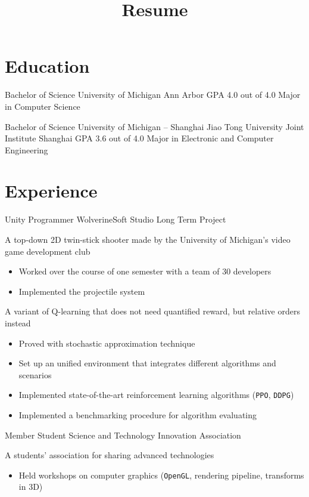 \documentclass[11pt, a4paper, sans]{moderncv}
\title{Resume}
\begin{document}
\makecvtitle
	
\section{Education}
{Bachelor of Science}
{University of Michigan}
{Ann Arbor}
{GPA 4.0 out of 4.0}
{Major in Computer Science}

{Bachelor of Science}
{University of Michigan -- Shanghai Jiao Tong University Joint Institute}
{Shanghai}
{GPA 3.6 out of 4.0}
{Major in Electronic and Computer Engineering}

\section{Experience}
{Unity Programmer}
{WolverineSoft Studio Long Term Project}
{}{}
{A top-down 2D twin-stick shooter made by the University of Michigan's video game development club
\begin{itemize}
\item Worked over the course of one semester with a team of 30 developers
\item Implemented the projectile system
\end{itemize}}

{
A variant of Q-learning that does not need quantified reward, but relative orders instead
\begin{itemize}
\item Proved with stochastic approximation technique
\end{itemize}}
{
\begin{itemize}
\item Set up an unified environment that integrates different algorithms and scenarios
\item Implemented state-of-the-art reinforcement learning algorithms (\texttt{PPO}, \texttt{DDPG})
\item Implemented a benchmarking procedure for algorithm evaluating
\end{itemize}
}

{Member}
{Student Science and Technology Innovation Association}
{}{}
{A students' association for sharing advanced technologies
\begin{itemize}
	\item Held workshops on computer graphics (\texttt{OpenGL}, rendering pipeline, transforms in 3D)
\end{itemize}}
\end{document}
